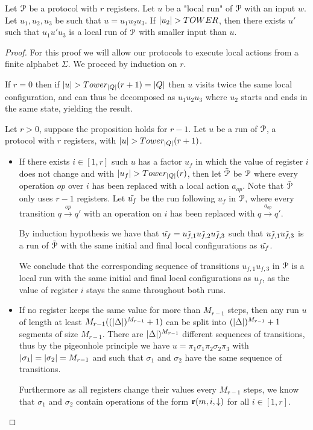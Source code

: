 

\newpage

\begin{lemma}
	Let $\mathcal{P}$ be a protocol with $r$ registers.
	Let $u$ be a "local run" of $\mathcal{P}$ with an input $w$.
	Let $u_1, u_2, u_3$ be such that $u=u_1u_2u_3$.
	If $|u_2| > TOWER$, then there exists $u'$ such that $u_1u'u_3$ is a local run of $\mathcal{P}$ with smaller input than $u$. 
\end{lemma}

\iffalse
\begin{proof}
	For this proof we will allow our protocols to execute local actions from a finite alphabet $\Sigma$.
	We proceed by induction on $r$.
	
	If $r=0$ then if $|u| > Tower_{|Q|}(r+1) = |Q|$ then $u$ visits twice the same local configuration, and can thus be decomposed as $u_1 u_2 u_3$ where $u_2$ starts and ends in the same state, yielding the result. 
	
	Let $r>0$, suppose the proposition holds for $r-1$.
	Let $u$ be a run of $\mathcal{P}$, a protocol with $r$ registers, with $|u| > Tower_{|Q|}(r+1)$.
	
	\begin{itemize}
		\item If there exists $i \in [1,r]$ such $u$ has a factor $u_f$ in which the value of register $i$ does not change and with $|u_f| > Tower_{|Q|}(r)$, then let $\Tilde{\mathcal{P}}$ be $\mathcal{P}$ where every operation $op$ over $i$ has been replaced with a local action $a_{op}$. Note that $\Tilde{\mathcal{P}}$ only uses $r-1$ registers. 
		Let $\Tilde{u_f}$ be the run following $u_f$ in $\mathcal{P}$, where every transition $q \xrightarrow{op} q'$ with an operation on $i$ has been replaced with $q \xrightarrow{a_{op}} q'$.
		
		By induction hypothesis we have that $\Tilde{u_f} = \Tilde{u_{f,1}} \Tilde{u_{f,2}}\Tilde{u_{f,3}}$ such that  $\Tilde{u_{f,1}}\Tilde{u_{f,3}}$ is a run of $\Tilde{\mathcal{P}}$ with the same initial and final local configurations as $\Tilde{u_f}$. 
		
		We conclude that the corresponding sequence of transitions $u_{f,1}u_{f,3}$ in $\mathcal{P}$ is a local run with the same initial and final local configurations as $u_f$, as the value of register $i$ stays the same throughout both runs.
		
		\item If no register keeps the same value for more than $M_{r-1}$ steps, then any run $u$ of length at least $M_{r-1} ((|\Delta|)^{M_{r-1}} +1)$ can be split into $(|\Delta|)^{M_{r-1}} +1$ segments of size $M_{r-1}$. There are $|\Delta|)^{M_{r-1}}$ different sequences of transitions, thus by the pigeonhole principle we have $u = \pi_1 \sigma_1 \pi_2 \sigma_2 \pi_3$ with $|\sigma_1| = |\sigma_2| = M_{r-1}$ and such that  $\sigma_1$ and $\sigma_2$ have the same sequence of transitions.
		
		Furthermore as all registers change their values every $M_{r-1}$ steps, we know that $\sigma_1$ and $\sigma_2$ contain operations of the form $\textbf{r}(m, i, \downarrow)$ for all $i \in [1,r]$.   
	\end{itemize}
\end{proof}
